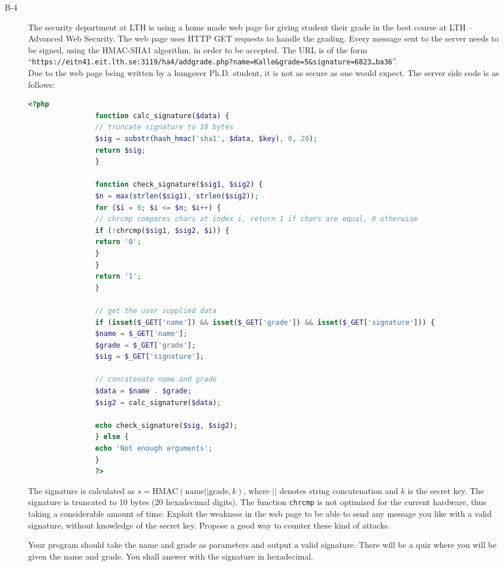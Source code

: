 \documentclass{article}
\begin{document}
\begin{description}
{				
			}
			\item[B-4]{The security department at LTH is using a home made web page for giving student their grade in the best course
				at LTH -- Advanced Web Security. The web page uses HTTP GET requests to handle the grading. Every message sent to the server
				needs to be signed, using the HMAC-SHA1 algorithm, in order to be accepted. The URL is of the form\\
				``\texttt{https://eitn41.eit.lth.se:3119/ha4/addgrade.php?name=Kalle\&grade=5\&signature=6823\ldots ba36}''.\\
				Due to the web page being written by a hungover Ph.D. student, it is not as secure as one would expect.
				The server side code is as follows:
				\begin{lstlisting}[float=htb, style=customc, language=php] 
				<?php
				function calc_signature($data) {
				// truncate signature to 10 bytes
				$sig = substr(hash_hmac('sha1', $data, $key), 0, 20);
				return $sig;
				}
				
				function check_signature($sig1, $sig2) {
				$n = max(strlen($sig1), strlen($sig2));
				for ($i = 0; $i <= $n; $i++) {
				// chrcmp compares chars at index i, return 1 if chars are equal, 0 otherwise
				if (!chrcmp($sig1, $sig2, $i)) {
				return '0';
				}
				}
				return '1';
				}
				
				// get the user supplied data
				if (isset($_GET['name']) && isset($_GET['grade']) && isset($_GET['signature'])) {
				$name = $_GET['name'];
				$grade = $_GET['grade'];
				$sig = $_GET['signature'];
				
				// concatenate name and grade
				$data = $name . $grade;
				$sig2 = calc_signature($data);
				
				echo check_signature($sig, $sig2);
				} else {
				echo 'Not enough arguments';
				}
				?>
				\end{lstlisting}
				
				The signature is calculated as $s = \textrm{HMAC}(\textrm{name}||\textrm{grade}, k)$, where $||$ denotes 
				string concatenation and $k$ is the secret key. The signature is truncated to 10 bytes (20 hexadecimal digits).
				The function \texttt{chrcmp} is not optimized for the current hardware, 
				thus taking a considerable amount of time.
				Exploit the weakness in the web page to be able to send any message you like with a valid signature, 
				without knowledge of the secret key. Propose a good way to counter these kind of attacks.
				
				Your program should take the name and grade as parameters and output a valid signature.
				There will be a quiz where you will be given the name and grade. You shall answer with the
				signature in hexadecimal.
				
}
\end{description}
\end{document}
